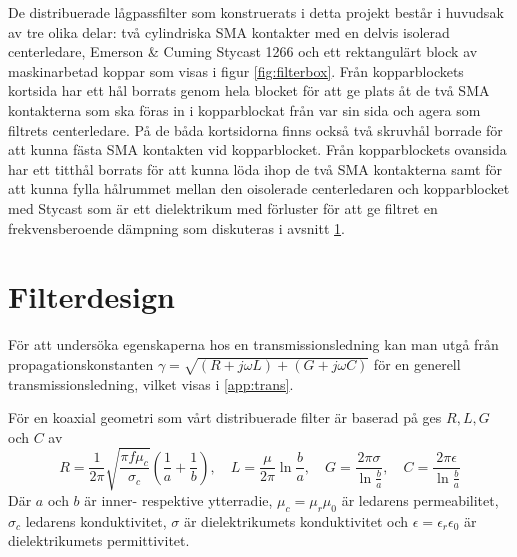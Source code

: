 \documentclass[main.tex]{subfiles}
\begin{document}
De distribuerade lågpassfilter som konstruerats i detta projekt består i huvudsak av tre olika delar: två cylindriska SMA kontakter med en delvis isolerad centerledare, Emerson \& Cuming Stycast 1266 och ett rektangulärt block av maskinarbetad koppar som visas i figur \ref{fig:filterbox}. Från kopparblockets kortsida har ett hål borrats genom hela blocket för att ge plats åt de två SMA kontakterna som ska föras in i kopparblockat från var sin sida och agera som filtrets centerledare. På de båda kortsidorna finns också två skruvhål borrade för att kunna fästa SMA kontakten vid kopparblocket. Från kopparblockets ovansida har ett titthål borrats för att kunna löda ihop de två SMA kontakterna samt för att kunna fylla hålrummet mellan den oisolerade centerledaren och kopparblocket med Stycast som är ett dielektrikum med förluster för att ge filtret en frekvensberoende dämpning som diskuteras i avsnitt \ref{sec:filterdesign}.

\section{Filterdesign}
\label{sec:filterdesign}
För att undersöka egenskaperna hos en transmissionsledning kan man utgå från propagationskonstanten $\gamma =\sqrt{(R+j\omega L)+(G+j\omega C)} $ för en generell transmissionsledning, vilket visas i \ref{app:trans}.

För en koaxial geometri som vårt distribuerade filter är baserad på ges $R, L, G$ och $C$ av
\begin{equation*}
    R=\frac{1}{2\pi}\sqrt{\frac{\pi f\mu_c}{\sigma_c}}\left(\frac{1}{a}+\frac{1}{b}\right),\hspace{1em} L=\frac{\mu}{2\pi}\ln\frac{b}{a},\hspace{1em}G=\frac{2\pi\sigma}{\ln\frac{b}{a}},\hspace{1em}C=\frac{2\pi\epsilon}{\ln\frac{b}{a}}
\end{equation*}
Där $a$ och $b$ är inner- respektive ytterradie, $\mu_c=\mu_r\mu_0$ är ledarens permeabilitet, $\sigma_c$ ledarens konduktivitet, $\sigma$ är dielektrikumets konduktivitet och $\epsilon =\epsilon_r\epsilon_0$ är dielektrikumets permittivitet. 
 
\end{document}
